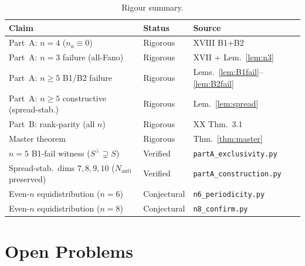 \documentclass[11pt,a4paper]{article}
\newcommand{\Nanti}{N_{\mathrm{anti}}}
\theoremstyle{plain}
\theoremstyle{definition}
\theoremstyle{remark}
\begin{document}
\begin{table}[H]
\centering
\caption{Rigour summary.}
\label{tab:rigor}
\renewcommand{\arraystretch}{1.1}
\begin{tabular}{p{6.5cm}ll}
\toprule
Claim & Status & Source \\
\midrule
Part~A: $n=4$ ($n_a \equiv 0$) &
  Rigorous & XVIII B1+B2 \\
Part~A: $n=3$ failure (all-Fano) &
  Rigorous & XVII + Lem.~\ref{lem:n3} \\
Part~A: $n \geq 5$ B1/B2 failure &
  Rigorous & Lems.~\ref{lem:B1fail}--\ref{lem:B2fail} \\
Part~A: $n \geq 5$ constructive (spread-stab.) &
  Rigorous & Lem.~\ref{lem:spread} \\
Part~B: rank-parity (all $n$) &
  Rigorous & XX Thm.~3.1 \\
Master theorem &
  Rigorous & Thm.~\ref{thm:master} \\
$n=5$ B1-fail witness ($S^\perp \supsetneq S$) &
  Verified & \texttt{partA\_exclusivity.py} \\
Spread-stab.\ dims $7,8,9,10$ ($\Nanti$ preserved) &
  Verified & \texttt{partA\_construction.py} \\
Even-$n$ equidistribution ($n=6$) &
  Conjectural & \texttt{n6\_periodicity.py} \\
Even-$n$ equidistribution ($n=8$) &
  Conjectural & \texttt{n8\_confirm.py} \\
\bottomrule
\end{tabular}
\end{table}

\section{Open Problems}
\label{sec:open}
\end{document}
